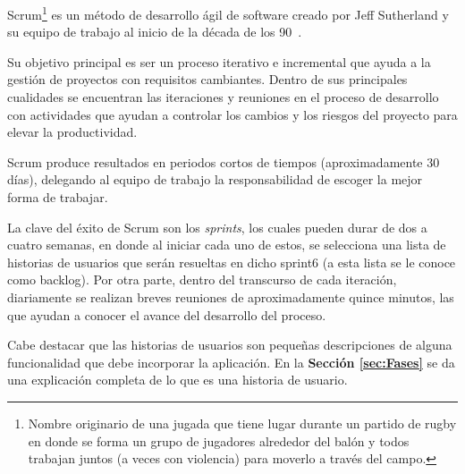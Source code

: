 Scrum\footnote{Nombre originario  de una jugada que tiene lugar durante un partido de rugby en donde se forma un grupo de jugadores alrededor del balón y todos trabajan juntos (a veces con violencia) para moverlo a través del campo. } es un método de desarrollo ágil de software creado por Jeff Sutherland y su equipo de trabajo al inicio de la década de los 90~\cite{7}.

Su objetivo principal es ser un proceso iterativo e incremental que ayuda a la gestión de proyectos con requisitos cambiantes. Dentro de sus principales cualidades se encuentran las iteraciones y reuniones en el proceso de desarrollo con actividades que ayudan a controlar los cambios y los riesgos del proyecto para elevar la productividad.

Scrum produce resultados en periodos cortos de tiempos (aproximadamente 30 días), delegando al equipo de trabajo la responsabilidad de escoger la mejor forma de trabajar.

La clave del éxito de Scrum son los \emph{sprints}, los cuales pueden durar de dos a cuatro semanas, en donde al iniciar cada uno de estos, se selecciona una lista de historias de usuarios que serán resueltas en dicho sprint6 (a esta lista se le conoce como backlog). Por otra parte, dentro del transcurso de cada iteración, diariamente se realizan breves reuniones de aproximadamente quince minutos, las que ayudan a conocer el avance del desarrollo del proceso.

Cabe destacar que las historias de usuarios son pequeñas descripciones de alguna funcionalidad que debe incorporar la aplicación. En la \textbf{Sección \ref{sec:Fases}} se da una explicación completa de lo que es una historia de usuario.
 

